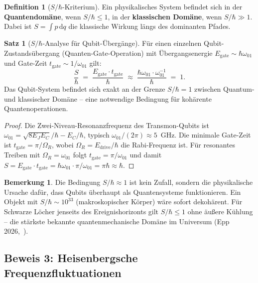 ﻿\documentclass[a4paper,12pt]{article}
\theoremstyle{definition}
\newtheorem{definition}{Definition}
\newtheorem{satz}{Satz}
\newtheorem{bemerkung}{Bemerkung}
\begin{document}
\begin{definition}[$S/\hbar$-Kriterium]
Ein physikalisches System befindet sich in der \textbf{Quantendomäne}, wenn
$S/\hbar \leq 1$, in der \textbf{klassischen Domäne}, wenn $S/\hbar \gg 1$.
Dabei ist $S = \int p\,\mathrm{d}q$ die klassische Wirkung längs des dominanten
Pfades.
\end{definition}

\begin{satz}[$S/\hbar$-Analyse für Qubit-Übergänge]
\label{satz:wirkung}
Für einen einzelnen Qubit-Zustandsübergang (Quanten-Gate-Operation) mit
Übergangsenergie $E_\mathrm{gate} \sim \hbar\omega_{01}$ und Gate-Zeit
$t_\mathrm{gate} \sim 1/\omega_{01}$ gilt:
\[
  \frac{S}{\hbar} \;=\; \frac{E_\mathrm{gate}\cdot t_\mathrm{gate}}{\hbar}
  \;\approx\; \frac{\hbar\omega_{01} \cdot \omega_{01}^{-1}}{\hbar}
  \;=\; 1.
\]
Das Qubit-System befindet sich exakt an der Grenze $S/\hbar = 1$ zwischen
Quantum- und klassischer Domäne -- eine notwendige Bedingung für kohärente
Quantenoperationen.
\end{satz}

\begin{proof}
Die Zwei-Niveau-Resonanzfrequenz des Transmon-Qubits ist
$\omega_{01} = \sqrt{8 E_J E_C}/\hbar - E_C/\hbar$, typisch
$\omega_{01}/(2\pi) \approx 5$~GHz. Die minimale Gate-Zeit ist
$t_\mathrm{gate} = \pi/\Omega_R$, wobei $\Omega_R = E_\mathrm{drive}/\hbar$
die Rabi-Frequenz ist. Für resonantes Treiben mit $\Omega_R = \omega_{01}$ folgt
$t_\mathrm{gate} = \pi/\omega_{01}$ und damit
$S = E_\mathrm{gate}\cdot t_\mathrm{gate} =
\hbar\omega_{01}\cdot\pi/\omega_{01} = \pi\hbar \approx \hbar$.
\end{proof}

\begin{bemerkung}
Die Bedingung $S/\hbar \approx 1$ ist kein Zufall, sondern die physikalische
Ursache dafür, dass Qubits überhaupt als Quantensysteme funktionieren. Ein Objekt
mit $S/\hbar \sim 10^{33}$ (makroskopischer Körper) wäre sofort dekohärent.
Für Schwarze Löcher jenseits des Ereignishorizonts gilt $S/\hbar \leq 1$ ohne
äußere Kühlung -- die stärkste bekannte quantenmechanische Domäne im Universum
(Epp 2026,~\cite{epp2026cnyn}).
\end{bemerkung}

\subsection{Beweis 3: Heisenbergsche Frequenzfluktuationen}
\label{sec:heisenberg}
\end{document}
